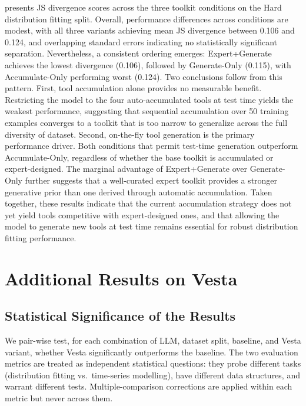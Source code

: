 \documentclass{article}
\newcommand{\method}{{\sc Vesta}}
\begin{document}
presents JS divergence scores across the three toolkit conditions on the Hard distribution fitting split. Overall, performance differences across conditions are modest, with all three variants achieving mean JS divergence between 0.106 and 0.124, and overlapping standard errors indicating no statistically significant separation. Nevertheless, a consistent ordering emerges: Expert+Generate achieves the lowest divergence (0.106), followed by Generate-Only (0.115), with Accumulate-Only performing worst (0.124). Two conclusions follow from this pattern. First, tool accumulation alone provides no measurable benefit. Restricting the model to the four auto-accumulated tools at test time yields the weakest performance, suggesting that sequential accumulation over 50 training examples converges to a toolkit that is too narrow to generalize across the full diversity of dataset. Second, on-the-fly tool generation is the primary performance driver. Both conditions that permit test-time generation outperform Accumulate-Only, regardless of whether the base toolkit is accumulated or expert-designed. The marginal advantage of Expert+Generate over Generate-Only further suggests that a well-curated expert toolkit provides a stronger generative prior than one derived through automatic accumulation. Taken together, these results indicate that the current accumulation strategy does not yet yield tools competitive with expert-designed ones, and that allowing the model to generate new tools at test time remains essential for robust distribution fitting performance.

\section{Additional Results on \method{}}
\label{app:additional_results}

\subsection{Statistical Significance of the Results}
\label{app:significance}

We pair-wise test, for each combination of LLM, dataset split, baseline, and \method{} 
variant, whether \method{} significantly outperforms the baseline. The two evaluation 
metrics are treated as independent statistical questions: they probe different tasks 
(distribution fitting vs.\ time-series modelling), have different data structures, and 
warrant different tests. Multiple-comparison corrections are applied within each metric 
but never across them.
\end{document}
